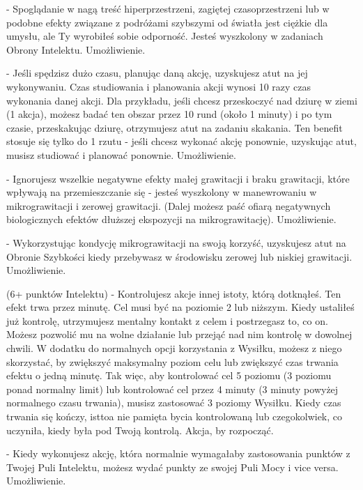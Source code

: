  - Spoglądanie w nagą treść hiperprzestrzeni, zagiętej czasoprzestrzeni lub w podobne efekty związane z podróżami szybszymi od światła jest ciężkie dla umysłu, ale Ty wyrobiłeś sobie odporność. Jesteś wyszkolony w zadaniach Obrony Intelektu. Umożliwienie. 

 - Jeśli spędzisz dużo czasu, planując daną akcję, uzyskujesz atut na jej wykonywaniu. Czas studiowania i planowania akcji wynosi 10 razy czas wykonania danej akcji. Dla przykładu, jeśli chcesz przeskoczyć nad dziurę w ziemi (1 akcja), możesz badać ten obszar przez 10 rund (około 1 minuty) i po tym czasie, przeskakując dziurę, otrzymujesz atut na zadaniu skakania. Ten benefit stosuje się tylko do 1 rzutu - jeśli chcesz wykonać akcję ponownie, uzyskując atut, musisz studiować i planować ponownie. Umożliwienie.

 - Ignorujesz wszelkie negatywne efekty małej grawitacji i braku grawitacji, które wpływają na przemieszczanie się - jesteś wyszkolony w manewrowaniu w mikrograwitacji i zerowej grawitacji. (Dalej możesz paść ofiarą negatywnych biologicznych efektów dłuższej ekspozycji na mikrograwitację). Umożliwienie.

 - Wykorzystując kondycję mikrograwitacji na swoją korzyść, uzyskujesz atut na Obronie Szybkości kiedy przebywasz w środowisku zerowej lub niskiej grawitacji. Umożliwienie. 

 (6+ punktów Intelektu) - Kontrolujesz akcje innej istoty, którą dotknąłeś. Ten efekt trwa przez minutę. Cel musi być na poziomie 2 lub niższym. Kiedy ustaliłeś już kontrolę, utrzymujesz mentalny kontakt z celem i postrzegasz to, co on. Możesz pozwolić mu na wolne działanie lub przejąć nad nim kontrolę w dowolnej chwili. W dodatku do normalnych opcji korzystania z Wysiłku, możesz z niego skorzystać, by zwiększyć maksymalny poziom celu lub zwiększyć czas trwania efektu o jedną minutę. Tak więc, aby kontrolować cel 5 poziomu (3 poziomu ponad normalny limit) lub kontrolować cel przez 4 minuty (3 minuty powyżej normalnego czasu trwania), musisz zastosować 3 poziomy Wysiłku. Kiedy czas trwania się kończy, isttoa nie pamięta bycia kontrolowaną lub czegokolwiek, co uczyniła, kiedy była pod Twoją kontrolą. Akcja, by rozpocząć. 

 - Kiedy wykonujesz akcję, która normalnie wymagałaby zastosowania punktów z Twojej Puli Intelektu, możesz wydać punkty ze swojej Puli Mocy i vice versa. Umożliwienie.

